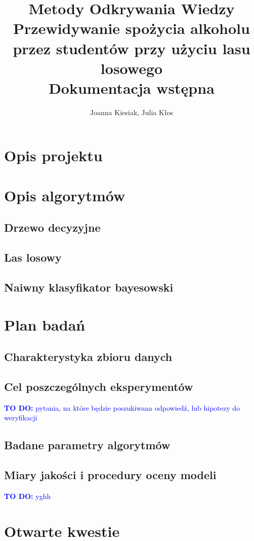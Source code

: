 \documentclass{article}
\title{{\normalfont Metody Odkrywania Wiedzy}\vspace{0.2cm} \\ 
Przewidywanie spożycia alkoholu przez studentów przy użyciu lasu losowego\\
\vspace{0.2cm}
\large{\normalfont Dokumentacja wstępna}}
\author{
Joanna Kiesiak, Julia Kłos\\

}
\newcommand{\todo}[1]{\textcolor{blue}{\textbf{TO DO:} #1}}
\begin{document}
\maketitle

\section{Opis projektu}

\section{Opis algorytmów}
\subsection{Drzewo decyzyjne}

\subsection{Las losowy}

\subsection{Naiwny klasyfikator bayesowski}

\section{Plan badań}
\subsection{Charakterystyka zbioru danych}

\subsection{Cel poszczególnych eksperymentów}
\todo{pytania, na które będzie poszukiwana odpowiedź, lub hipotezy do weryfikacji}

\subsection{Badane parametry algorytmów}


\subsection{Miary jakości i procedury oceny modeli}

\todo{yghh}
\section{Otwarte kwestie}



\end{document}
